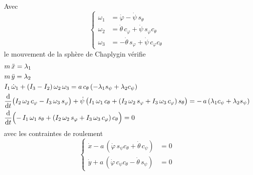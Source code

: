 \begin{theoreme}
    Avec
    \[
        \left\{
        \begin{aligned}
            \omega_1 &= \dot\varphi - \dot\psi\,s_\theta\\
            \omega_2 &= \dot\theta\,c_\varphi
                + \dot\psi\,s_\varphi c_\theta\\
            \omega_3 &= -\dot\theta\,s_\varphi
                + \dot\psi\,c_\varphi c_\theta
        \end{aligned}
        \right.
    \]
    le mouvement de la sphère de Chaplygin vérifie
    \begin{align*}
        &m\,\ddot x = \lambda_1\\
        &m\,\ddot y = \lambda_2\\
        &I_1\,\dot\omega_1 + (I_3 - I_2)\,\omega_2\,\omega_3
            = a\,c_\theta\,(-\lambda_1 s_\psi + \lambda_2 c_\psi)\\
        &\frac{\mathrm{d}}{\mathrm{d} t}\bigl(I_2\,\omega_2\,c_\varphi
            - I_3\,\omega_3\,s_\varphi\bigr)
            + \dot\psi\,\bigl(I_1\,\omega_1\,c_\theta
            + (I_2\,\omega_2\,s_\varphi
            + I_3\,\omega_3\,c_\varphi)\,s_\theta\bigr)
            = -\,a\,(\lambda_1 c_\psi + \lambda_2 s_\psi)\\
        &\frac{\mathrm{d}}{\mathrm{d} t}\Bigl(-\,I_1\,\omega_1\,s_\theta
            + (I_2\,\omega_2\,s_\varphi
            + I_3\,\omega_3\,c_\varphi)\,c_\theta\Bigr) = 0
    \end{align*}
    avec les contraintes de roulement
    \[
        \left\{
        \begin{aligned}
            \dot x - a\,(\dot\varphi\,s_\psi c_\theta
                + \dot\theta\,c_\psi) &= 0\\
            \dot y + a\,(\dot\varphi\,c_\psi c_\theta
                - \dot\theta\,s_\psi) &= 0
        \end{aligned}
        \right.
    \]
\end{theoreme}
